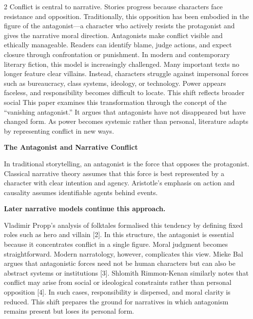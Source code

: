 \documentclass[12pt,a4paper]{article}
\begin{document}
\setlength{\columnsep}{20pt}
\begin{multicols}{2}
\fontsize{9}{11}\selectfont
\noindent
Conflict is central to narrative. Stories progress because 
characters face resistance and opposition. Traditionally, this 
opposition has been embodied in the figure of the antagonist—a 
character who actively resists the protagonist and gives the 
narrative moral direction. Antagonists make conflict visible and 
ethically manageable. Readers can identify blame, judge actions, and expect closure through confrontation or punishment. In modern and contemporary literary fiction, this model is increasingly challenged. Many important texts no longer feature clear villains. Instead, characters struggle against impersonal forces such as bureaucracy, class systems, ideology, 
or technology. Power appears faceless, and responsibility
becomes difficult to locate. This shift reflects broader social 
This paper examines this transformation through the concept of 
the “vanishing antagonist.” It argues that antagonists have not 
disappeared but have changed form. As power becomes 
systemic rather than personal, literature adapts by representing 
conflict in new ways. 

\vspace{8pt}
\noindent
\textbf{The Antagonist and Narrative Conflict}

\noindent
In traditional storytelling, an antagonist is the force that opposes 
the protagonist. Classical narrative theory assumes that this 
force is best represented by a character with clear intention and 
agency. Aristotle’s emphasis on action and causality assumes 
identifiable agents behind events.

\vspace{8pt}
\noindent
\textbf{Later narrative models continue this approach.}

\noindent
Vladimir Propp’s analysis of folktales formalised this tendency 
by defining fixed roles such as hero and villain [2]. In this 
structure, the antagonist is essential because it concentrates 
conflict in a single figure. Moral judgment becomes 
straightforward. 
Modern narratology, however, complicates this view. Mieke 
Bal argues that antagonistic forces need not be human 
characters but can also be abstract systems or institutions [3]. 
Shlomith Rimmon-Kenan similarly notes that conflict may arise 
from social or ideological constraints rather than personal 
opposition [4]. In such cases, responsibility is dispersed, and 
moral clarity is reduced. 
This shift prepares the ground for narratives in which 
antagonism remains present but loses its personal form.


\end{multicols}
\end{document}
